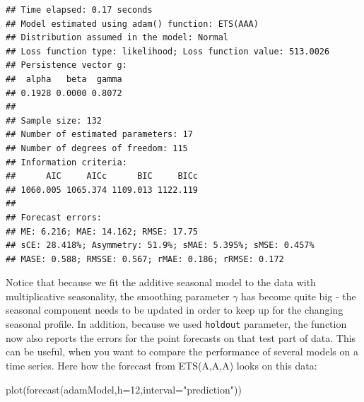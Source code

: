 \documentclass[
]{book}
\newenvironment{Shaded}{\begin{snugshade}}{\end{snugshade}}
\newcommand{\AttributeTok}[1]{\textcolor[rgb]{0.77,0.63,0.00}{#1}}
\newcommand{\ConstantTok}[1]{\textcolor[rgb]{0.00,0.00,0.00}{#1}}
\newcommand{\DecValTok}[1]{\textcolor[rgb]{0.00,0.00,0.81}{#1}}
\newcommand{\FloatTok}[1]{\textcolor[rgb]{0.00,0.00,0.81}{#1}}
\newcommand{\FunctionTok}[1]{\textcolor[rgb]{0.00,0.00,0.00}{#1}}
\newcommand{\NormalTok}[1]{#1}
\newcommand{\OtherTok}[1]{\textcolor[rgb]{0.56,0.35,0.01}{#1}}
\newcommand{\SpecialCharTok}[1]{\textcolor[rgb]{0.00,0.00,0.00}{#1}}
\newcommand{\StringTok}[1]{\textcolor[rgb]{0.31,0.60,0.02}{#1}}
\theoremstyle{definition}
\theoremstyle{definition}
\theoremstyle{definition}
\theoremstyle{definition}
\theoremstyle{remark}
\begin{document}
\begin{Shaded}
\end{Shaded}

\begin{verbatim}
## Time elapsed: 0.17 seconds
## Model estimated using adam() function: ETS(AAA)
## Distribution assumed in the model: Normal
## Loss function type: likelihood; Loss function value: 513.0026
## Persistence vector g:
##  alpha   beta  gamma 
## 0.1928 0.0000 0.8072 
## 
## Sample size: 132
## Number of estimated parameters: 17
## Number of degrees of freedom: 115
## Information criteria:
##      AIC     AICc      BIC     BICc 
## 1060.005 1065.374 1109.013 1122.119 
## 
## Forecast errors:
## ME: 6.216; MAE: 14.162; RMSE: 17.75
## sCE: 28.418%; Asymmetry: 51.9%; sMAE: 5.395%; sMSE: 0.457%
## MASE: 0.588; RMSSE: 0.567; rMAE: 0.186; rRMSE: 0.172
\end{verbatim}

Notice that because we fit the additive seasonal model to the data with multiplicative seasonality, the smoothing parameter \(\gamma\) has become quite big - the seasonal component needs to be updated in order to keep up for the changing seasonal profile. In addition, because we used \texttt{holdout} parameter, the function now also reports the errors for the point forecasts on that test part of data. This can be useful, when you want to compare the performance of several models on a time series. Here how the forecast from ETS(A,A,A) looks on this data:

\begin{Shaded}
\begin{Highlighting}[]
\FunctionTok{plot}\NormalTok{(}\FunctionTok{forecast}\NormalTok{(adamModel,}\AttributeTok{h=}\DecValTok{12}\NormalTok{,}\AttributeTok{interval=}\StringTok{"prediction"}\NormalTok{))}
\end{Highlighting}
\end{Shaded}
\end{document}
